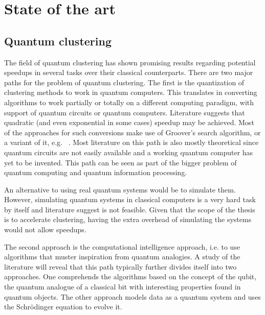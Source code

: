 
\section{State of the art}



\subsection{Quantum clustering}
The field of quantum clustering has shown promising results regarding potential speedups in several tasks over their classical counterparts. 
There are two major paths for the problem of quantum clustering. The first is the quantization of clustering methods to work in quantum computers. This translates in converting algorithms to work partially or totally on a different computing paradigm, with support of quantum circuits or quantum computers. Literature suggests that quadratic (and even exponential in some cases) speedup may be achieved. Most of the approaches for such conversions make use of Groover's search algorithm, or a variant of it, e.g. ~\cite{Wiebe2014}. Most literature on this path is also mostly theoretical since quantum circuits are not easily available and a working quantum computer has yet to be invented. This path can be seen as part of the bigger problem of quantum computing and quantum information processing.


An alternative to using real quantum systems would be to simulate them. However, simulating quantum systems in classical computers is a very hard task by itself and literature suggest is not feasible. Given that the scope of the thesis is to accelerate clustering, having the extra overhead of simulating the systems would not allow speedups.

The second approach is the computational intelligence approach, i.e.  to use algorithms that muster inspiration from quantum analogies. A study of the literature will reveal that this path typically further divides itself into two approaches. One comprehends the algorithms based on the concept of the \gls{qubit}, the quantum analogue of a classical bit with interesting properties found in quantum objects. The other approach models data as a quantum system and uses the Schrödinger equation to evolve it.

